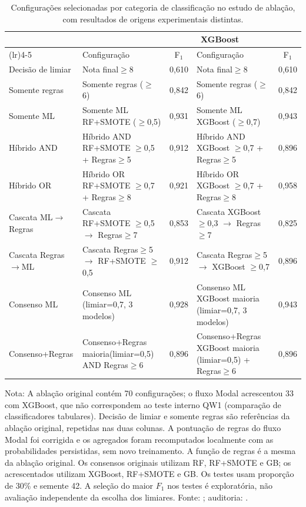 \begin{table}[htbp]
\centering
\caption{Configurações selecionadas por categoria de classificação no estudo de ablação, com resultados de origens experimentais distintas.}
\label{tab:ablation-best-category}
\footnotesize
\begin{tabular}{>{\raggedright\arraybackslash}p{3cm}>{\raggedright\arraybackslash}p{3.2cm}c>{\raggedright\arraybackslash}p{3.2cm}c}
\toprule
\multirow{2}{*}{Categoria} & \multicolumn{2}{c}{Ablação original} & \multicolumn{2}{c}{XGBoost} \\
\cmidrule(lr){2-3} \cmidrule(lr){4-5}
 & Configuração & F$_1$ & Configuração & F$_1$ \\
\midrule
Decisão de limiar & Nota final$\geq$8 & 0,610 & Nota final$\geq$8 & 0,610 \\
Somente regras & Somente regras ($\geq$6) & 0,842 & Somente regras ($\geq$6) & 0,842 \\
Somente ML & Somente ML RF+SMOTE ($\geq$0,5) & 0,931 & Somente ML XGBoost ($\geq$0,7) & 0,943 \\
Híbrido AND & Híbrido AND RF+SMOTE $\geq$0,5 + Regras$\geq$5 & 0,912 & Híbrido AND XGBoost $\geq$0,7 + Regras$\geq$5 & 0,896 \\
Híbrido OR & Híbrido OR RF+SMOTE $\geq$0,7 + Regras$\geq$8 & 0,921 & Híbrido OR XGBoost $\geq$0,7 + Regras$\geq$8 & 0,958 \\
Cascata ML$\rightarrow$Regras & Cascata RF+SMOTE $\geq$0,5 $\rightarrow$ Regras$\geq$7 & 0,853 & Cascata XGBoost $\geq$0,3 $\rightarrow$ Regras$\geq$7 & 0,825 \\
Cascata Regras$\rightarrow$ML & Cascata Regras$\geq$5 $\rightarrow$ RF+SMOTE $\geq$0,5 & 0,912 & Cascata Regras$\geq$5 $\rightarrow$ XGBoost $\geq$0,7 & 0,896 \\
Consenso ML & Consenso ML (limiar=0,7, 3 modelos) & 0,928 & Consenso ML XGBoost maioria (limiar=0,7, 3 modelos) & 0,943 \\
Consenso+Regras & Consenso+Regras maioria(limiar=0,5) AND Regras$\geq$6 & 0,896 & Consenso+Regras XGBoost maioria (limiar=0,5) + Regras$\geq$6 & 0,896 \\
\bottomrule
\end{tabular}
\vspace{2pt}
\par\small Nota: A ablação original contém 70 configurações; o fluxo Modal acrescentou 33 com XGBoost, que não correspondem ao teste interno QW1 (comparação de classificadores tabulares). Decisão de limiar e somente regras são referências da ablação original, repetidas nas duas colunas. A pontuação de regras do fluxo Modal foi corrigida e os agregados foram recomputados localmente com as probabilidades persistidas, sem novo treinamento. A função de regras é a mesma da ablação original. Os consensos originais utilizam RF, RF+SMOTE e GB; os acrescentados utilizam XGBoost, RF+SMOTE e GB. Os testes usam proporção de 30\% e semente 42. A seleção do maior $F_1$ nos testes é exploratória, não avaliação independente da escolha dos limiares. Fonte: ; auditoria: .

\end{table}
